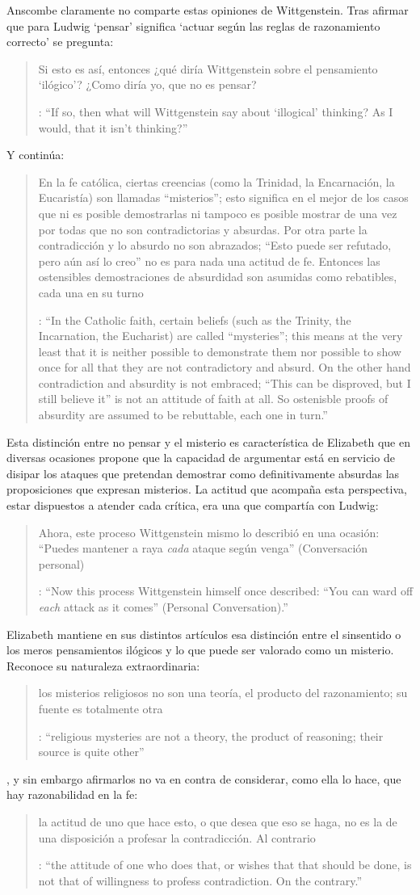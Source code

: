 Anscombe claramente no comparte estas opiniones de Wittgenstein. Tras afirmar que para Ludwig `pensar' significa \enquote*{actuar según las reglas de razonamiento correcto} se pregunta: \blockquote[{\cite[122]{anscombe1981parmenides:qli}}: \enquote{If so, then what will Wittgenstein say about `illogical' thinking? As I would, that it isn't thinking?}]{Si esto es así, entonces ¿qué diría Wittgenstein sobre el pensamiento `ilógico'? ¿Como diría yo, que no es pensar?} Y continúa: \blockquote[{\cite[122]{anscombe1981parmenides:qli}}: \enquote{In the Catholic faith, certain beliefs (such as the Trinity, the Incarnation, the Eucharist) are called ``mysteries''; this means at the very least that it is neither possible to demonstrate them nor possible to show once for all that they are not contradictory and absurd. On the other hand contradiction and absurdity is not embraced; ``This can be disproved, but I still believe it'' is not an attitude of faith at all. So ostenisble proofs of absurdity are assumed to be rebuttable, each one in turn.}]{En la fe católica, ciertas creencias (como la Trinidad, la Encarnación, la Eucaristía) son llamadas ``misterios''; esto significa en el mejor de los casos que ni es posible demostrarlas ni tampoco es posible mostrar de una vez por todas que no son contradictorias y absurdas. Por otra parte la contradicción y lo absurdo no son abrazados; ``Esto puede ser refutado, pero aún así lo creo'' no es para nada una actitud de fe. Entonces las ostensibles demostraciones de absurdidad son asumidas como rebatibles, cada una en su turno}. Esta distinción entre no pensar y el misterio es característica de Elizabeth que en diversas ocasiones propone que la capacidad de argumentar está en servicio de disipar los ataques que pretendan demostrar como definitivamente absurdas las proposiciones que expresan misterios. La actitud que acompaña esta perspectiva, estar dispuestos a atender cada crítica, era una que compartía con Ludwig: \blockquote[{\cite[122]{anscombe1981parmenides:qli}}: \enquote{Now this process Wittgenstein himself once described: ``You can ward off \emph{each} attack as it comes'' (Personal Conversation).}]{Ahora, este proceso Wittgenstein mismo lo describió en una ocasión: ``Puedes mantener a raya \emph{cada} ataque según venga'' (Conversación personal)}.

Elizabeth mantiene en sus distintos artículos esa distinción entre el sinsentido o los meros pensamientos ilógicos y lo que puede ser valorado como un misterio. Reconoce su naturaleza extraordinaria: \blockquote[{\cite[122-123]{anscombe1981parmenides:qli}}: \enquote{religious mysteries are not a theory, the product of reasoning; their source is quite other}]{los misterios religiosos no son una teoría, el producto del razonamiento; su fuente es totalmente otra}, y sin embargo afirmarlos no va en contra de considerar, como ella lo hace, que hay razonabilidad en la fe: \blockquote[{\cite[122]{anscombe1981parmenides:qli}}: \enquote{the attitude of one who does that, or wishes that that should be done, is not that of willingness to profess contradiction. On the contrary.}]{la actitud de uno que hace esto, o que desea que eso se haga, no es la de una disposición a profesar la contradicción. Al contrario}.
